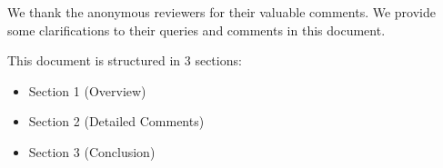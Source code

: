 We thank the anonymous reviewers for their valuable comments. We provide some clarifications
to their queries and comments in this document. 

This document is structured in 3 sections:

\begin{itemize}
	\item Section 1 (Overview)
	\item Section 2 (Detailed Comments)
	\item Section 3 (Conclusion)
\end{itemize}
